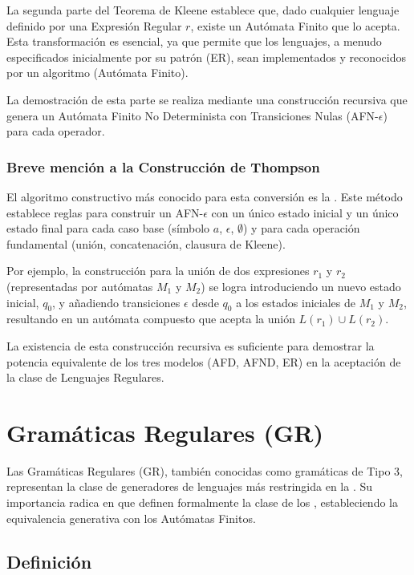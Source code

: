 La segunda parte del Teorema de Kleene establece que, dado cualquier lenguaje definido por una Expresión Regular $r$, existe un Autómata Finito que lo acepta. Esta transformación es esencial, ya que permite que los lenguajes, a menudo especificados inicialmente por su patrón (ER), sean implementados y reconocidos por un algoritmo (Autómata Finito).

La demostración de esta parte se realiza mediante una construcción recursiva que genera un Autómata Finito No Determinista con Transiciones Nulas (AFN-$\epsilon$) para cada operador.

\subsubsection{Breve mención a la Construcción de Thompson}

El algoritmo constructivo más conocido para esta conversión es la . Este método establece reglas para construir un AFN-$\epsilon$ con un único estado inicial y un único estado final para cada caso base (símbolo $a$, $\epsilon$, $\emptyset$) y para cada operación fundamental (unión, concatenación, clausura de Kleene).

Por ejemplo, la construcción para la unión de dos expresiones $r_1$ y $r_2$ (representadas por autómatas $M_1$ y $M_2$) se logra introduciendo un nuevo estado inicial, $q_0$, y añadiendo transiciones $\epsilon$ desde $q_0$ a los estados iniciales de $M_1$ y $M_2$, resultando en un autómata compuesto que acepta la unión $L(r_1) \cup L(r_2)$.

La existencia de esta construcción recursiva es suficiente para demostrar la potencia equivalente de los tres modelos (AFD, AFND, ER) en la aceptación de la clase de Lenguajes Regulares.


\section{Gramáticas Regulares (GR)} %

Las Gramáticas Regulares (GR), también conocidas como gramáticas de Tipo 3, representan la clase de generadores de lenguajes más restringida en la . Su importancia radica en que definen formalmente la clase de los , estableciendo la equivalencia generativa con los Autómatas Finitos.

\subsection{Definición} %

